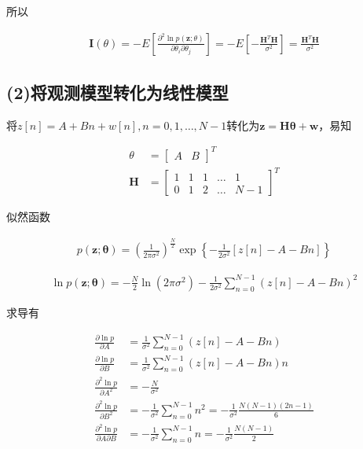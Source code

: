 \documentclass[fontset=windows]{article}
\numberwithin{figure}{section}
\begin{document}
所以

\begin{align*}
    \mathbf{I}(\theta)=
    -E\left[\frac{\partial^2 \ln p(\mathbf{z};\theta)}{\partial \theta_i \partial \theta_j}\right]
    =-E\left[-\frac{\mathbf{H}^T\mathbf{H}}{\sigma^2}\right]
    =\frac{\mathbf{H}^T\mathbf{H}}{\sigma^2}
\end{align*}

\subsection*{(2)将观测模型转化为线性模型}

将\(z[n]=A+Bn+w[n],n=0,1,…,N-1\)转化为\(\mathbf{z}=\mathbf{H}\boldsymbol{\theta}+\mathbf{w}\)，易知

\begin{align*}
    \theta     & =
    \begin{bmatrix}
        A & B
    \end{bmatrix}^T \\
    \mathbf{H} & =
    \begin{bmatrix}
        1 & 1 & 1 & … & 1   \\
        0 & 1 & 2 & … & N-1
    \end{bmatrix}^T
\end{align*}

似然函数

\begin{align*}
    p(\mathbf{z};\boldsymbol{\theta})=(\frac{1}{2\pi \sigma^2})^{\frac{N}{2}}
    \exp\left\{-\frac{1}{2\sigma^2}\left[z[n]-A-Bn\right]\right\}
\end{align*}

\begin{align*}
    \ln p(\mathbf{z};\boldsymbol{\theta})=-{\frac{N}{2}}\ln (2\pi \sigma^2)
    -\frac{1}{2\sigma^2}\sum_{n=0}^{N-1}\left(z[n]-A-Bn\right)^2
\end{align*}

求导有

\begin{align*}
    \frac{\partial \ln p}{\partial A}
     & =\frac{1}{\sigma^2}\sum_{n=0}^{N-1}\left(z[n]-A-Bn\right)  \\
    \frac{\partial \ln p}{\partial B}
     & =\frac{1}{\sigma^2}\sum_{n=0}^{N-1}\left(z[n]-A-Bn\right)n \\
    \frac{\partial^2 \ln p}{\partial A^2}
     & =-\frac{N}{\sigma^2}                                       \\
    \frac{\partial^2 \ln p}{\partial B^2}
     & =-\frac{1}{\sigma^2}\sum_{n=0}^{N-1}n^2
    =-\frac{1}{\sigma^2}\frac{N(N-1)(2n-1)}{6}                    \\
    \frac{\partial^2 \ln p}{\partial A \partial B}
     & =-\frac{1}{\sigma^2}\sum_{n=0}^{N-1}n
    =-\frac{1}{\sigma^2}\frac{N(N-1)}{2}
\end{align*}
\end{document}
